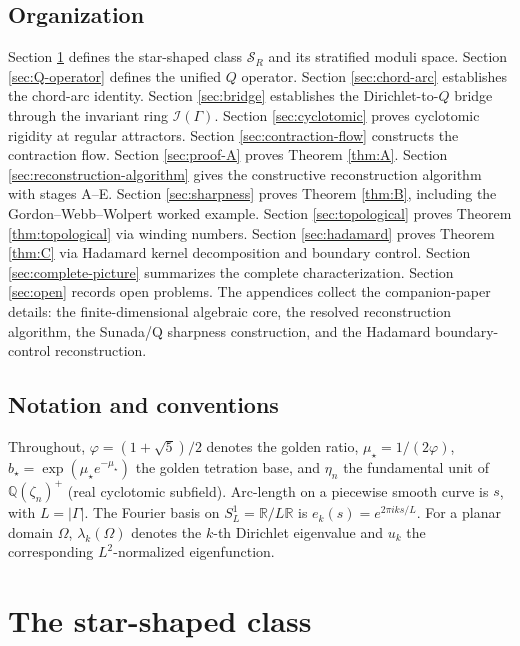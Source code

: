 \documentclass[11pt,reqno]{amsart}
\theoremstyle{plain}
\theoremstyle{definition}
\theoremstyle{remark}
\newcommand{\Reals}{\mathbb{R}}
\newcommand{\Rats}{\mathbb{Q}}
\newcommand{\Scal}{\mathcal{S}}
\newcommand{\Qop}{Q}
\newcommand{\Icalbb}{\mathcal{I}}
\newcommand{\bstar}{b_{\star}}
\newcommand{\mustar}{\mu_{\star}}
\begin{document}
\subsection{Organization}\label{ss:organization-intro}

Section \ref{sec:class} defines the star-shaped class $\Scal_R$ and its stratified moduli space. Section \ref{sec:Q-operator} defines the unified $\Qop$ operator. Section \ref{sec:chord-arc} establishes the chord-arc identity. Section \ref{sec:bridge} establishes the Dirichlet-to-$\Qop$ bridge through the invariant ring $\Icalbb(\Gamma)$. Section \ref{sec:cyclotomic} proves cyclotomic rigidity at regular attractors. Section \ref{sec:contraction-flow} constructs the contraction flow. Section \ref{sec:proof-A} proves Theorem \ref{thm:A}. Section \ref{sec:reconstruction-algorithm} gives the constructive reconstruction algorithm with stages A--E. Section \ref{sec:sharpness} proves Theorem \ref{thm:B}, including the Gordon--Webb--Wolpert worked example. Section \ref{sec:topological} proves Theorem \ref{thm:topological} via winding numbers. Section \ref{sec:hadamard} proves Theorem \ref{thm:C} via Hadamard kernel decomposition and boundary control. Section \ref{sec:complete-picture} summarizes the complete characterization. Section \ref{sec:open} records open problems. The appendices collect the companion-paper details: the finite-dimensional algebraic core, the resolved reconstruction algorithm, the Sunada/Q sharpness construction, and the Hadamard boundary-control reconstruction.

\subsection{Notation and conventions}\label{ss:notation}

Throughout, $\varphi = (1+\sqrt 5)/2$ denotes the golden ratio, $\mustar = 1/(2\varphi)$, $\bstar = \exp(\mustar e^{-\mustar})$ the golden tetration base, and $\eta_n$ the fundamental unit of $\Rats(\zeta_n)^+$ (real cyclotomic subfield). Arc-length on a piecewise smooth curve is $s$, with $L = |\Gamma|$. The Fourier basis on $S^1_L = \Reals/L\Reals$ is $e_k(s) = e^{2\pi i k s/L}$. For a planar domain $\Omega$, $\lambda_k(\Omega)$ denotes the $k$-th Dirichlet eigenvalue and $u_k$ the corresponding $L^2$-normalized eigenfunction.

\section{The star-shaped class}\label{sec:class}
\end{document}
